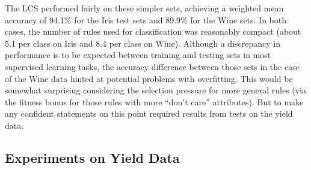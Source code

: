 \documentclass[12pt,twoside]{article}
\begin{document}
The LCS performed fairly on these simpler sets, achieving a weighted mean accuracy of 94.1\% for the Iris test sets and 89.9\% for the Wine sets. In both cases, the number of rules used for classification was reasonably compact (about 5.1 per class on Iris and 8.4 per class on Wine). Although a discrepancy in performance is to be expected between training and testing sets in most supervised learning tasks, the accuracy difference between those sets in the case of the Wine data hinted at potential problems with overfitting. This would be somewhat surprising considering the selection pressure  for more general rules (via the fitness bonus for those rules with more ``don't care'' attributes). But to make any confident statements on this point required results from tests on the yield data.

\subsection{Experiments on Yield Data}
\end{document}
